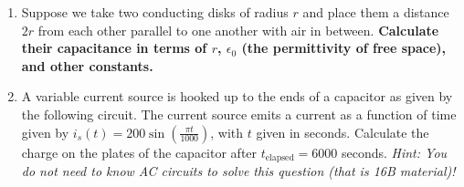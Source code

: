 \begin{enumerate}

\item
Suppose we take two conducting disks of radius $r$ and place them a distance $2r$ from each other parallel to one another with air in between. \textbf{Calculate their capacitance in terms of $r$, $\epsilon_0$ (the permittivity of free space), and other constants.} \\ 

\item A variable current source is hooked up to the ends of a capacitor as given by the following circuit. The current source emits a current as a function of time given by $i_s(t) = 200 \sin(\frac{\pi t}{1000})$, with $t$ given in seconds. Calculate the charge on the plates of the capacitor after $t_{\text{elapsed}} = 6000$ seconds. \emph{Hint: You do not need to know AC circuits to solve this question (that is 16B material)!} \\


\end{enumerate}
